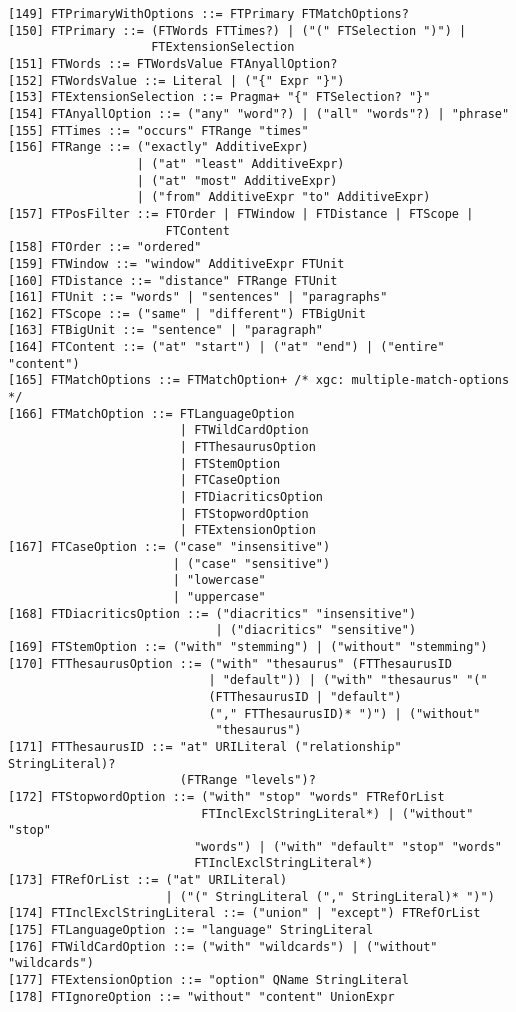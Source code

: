 \begin{verbatim}
[149] FTPrimaryWithOptions ::= FTPrimary FTMatchOptions?
[150] FTPrimary ::= (FTWords FTTimes?) | ("(" FTSelection ")") |
                    FTExtensionSelection 
[151] FTWords ::= FTWordsValue FTAnyallOption?
[152] FTWordsValue ::= Literal | ("{" Expr "}")
[153] FTExtensionSelection ::= Pragma+ "{" FTSelection? "}"
[154] FTAnyallOption ::= ("any" "word"?) | ("all" "words"?) | "phrase"
[155] FTTimes ::= "occurs" FTRange "times"
[156] FTRange ::= ("exactly" AdditiveExpr)
                  | ("at" "least" AdditiveExpr)
                  | ("at" "most" AdditiveExpr)
                  | ("from" AdditiveExpr "to" AdditiveExpr)
[157] FTPosFilter ::= FTOrder | FTWindow | FTDistance | FTScope |
                      FTContent 
[158] FTOrder ::= "ordered"
[159] FTWindow ::= "window" AdditiveExpr FTUnit
[160] FTDistance ::= "distance" FTRange FTUnit
[161] FTUnit ::= "words" | "sentences" | "paragraphs"
[162] FTScope ::= ("same" | "different") FTBigUnit
[163] FTBigUnit ::= "sentence" | "paragraph"
[164] FTContent ::= ("at" "start") | ("at" "end") | ("entire" "content")
[165] FTMatchOptions ::= FTMatchOption+	/* xgc: multiple-match-options */
[166] FTMatchOption ::= FTLanguageOption
                        | FTWildCardOption
                        | FTThesaurusOption
                        | FTStemOption
                        | FTCaseOption
                        | FTDiacriticsOption
                        | FTStopwordOption
                        | FTExtensionOption
[167] FTCaseOption ::= ("case" "insensitive")
                       | ("case" "sensitive")
                       | "lowercase"
                       | "uppercase"
[168] FTDiacriticsOption ::= ("diacritics" "insensitive")
                             | ("diacritics" "sensitive")
[169] FTStemOption ::= ("with" "stemming") | ("without" "stemming")
[170] FTThesaurusOption ::= ("with" "thesaurus" (FTThesaurusID 
                            | "default")) | ("with" "thesaurus" "("
                            (FTThesaurusID | "default")
                            ("," FTThesaurusID)* ")") | ("without"
                             "thesaurus")
[171] FTThesaurusID ::= "at" URILiteral ("relationship" StringLiteral)?
                        (FTRange "levels")?
[172] FTStopwordOption ::= ("with" "stop" "words" FTRefOrList
                           FTInclExclStringLiteral*) | ("without" "stop"
                          "words") | ("with" "default" "stop" "words"  
                          FTInclExclStringLiteral*) 
[173] FTRefOrList ::= ("at" URILiteral)
                      | ("(" StringLiteral ("," StringLiteral)* ")")
[174] FTInclExclStringLiteral ::= ("union" | "except") FTRefOrList
[175] FTLanguageOption ::= "language" StringLiteral
[176] FTWildCardOption ::= ("with" "wildcards") | ("without" "wildcards")
[177] FTExtensionOption ::= "option" QName StringLiteral
[178] FTIgnoreOption ::= "without" "content" UnionExpr
\end{verbatim}


